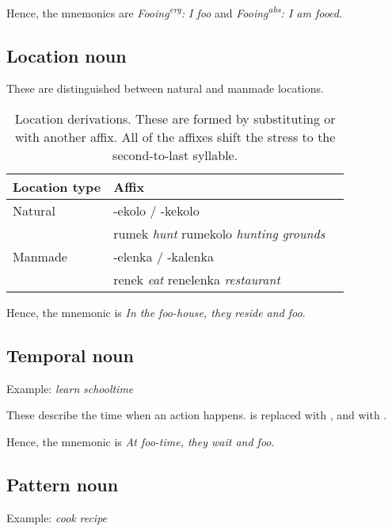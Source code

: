 \documentclass{book}
\begin{document}
Hence, the mnemonics are  \emph{Fooing\textsuperscript{erg}: I foo} and  \emph{Fooing\textsuperscript{abs}: I am fooed}.

\subsection{Location noun}

These are distinguished between natural and manmade locations.

\begin{table}[h]
    \caption{Location derivations. These are formed by substituting  or  with another affix. All of the affixes shift the stress to the second-to-last syllable.}
    \centering
    \begin{tabular}{|l|l|l|}
        \hline
        Location type & Affix \\
        \hline
        Natural & -ekolo / -kekolo \\
        & rumek \emph{hunt} \ra{} rumekolo \emph{hunting grounds} \\
        \hline
        Manmade & -elenka / -kalenka \\
        & renek \emph{eat} \ra{} renelenka \emph{restaurant} \\
        \hline
    \end{tabular}
\end{table}

Hence, the mnemonic is  \emph{In the foo-house, they reside and foo}.

\subsection{Temporal noun}

Example:  \emph{learn} \ra{}  \emph{schooltime}

These describe the time when an action happens.  is replaced with , and  with .

Hence, the mnemonic is  \emph{At foo-time, they wait and foo}.

\subsection{Pattern noun}

Example:  \emph{cook} \ra{}  \emph{recipe}
\end{document}
